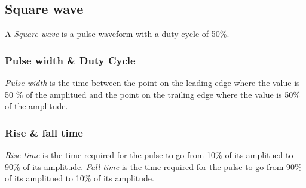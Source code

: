 \subsection{Square wave}

A \textit{Square wave} is a pulse waveform with a duty cycle of 50\%.
\subsubsection{Pulse width \& Duty Cycle}
\textit{Pulse width} is the time between the point on the leading edge where the value is 50 \% of the amplitued and the point on the trailing edge where the value is 50\% of the amplitude. 

\subsubsection{Rise \& fall time}
\textit{Rise time} is the time required for the pulse to go from 10\% of its amplitued to 90\% of its amplitude. 
\newline \textit{Fall time} is the time required for the pulse to go from 90\% of its amplitued to 10\% of its amplitude.
